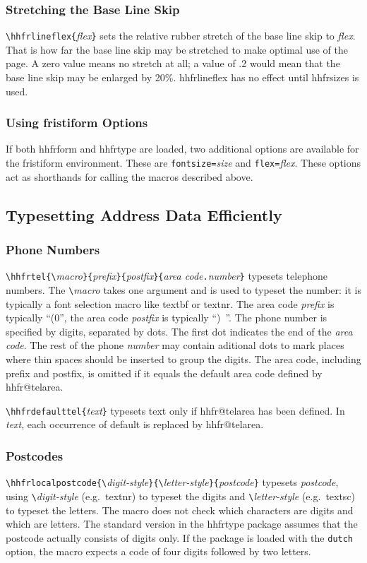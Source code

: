\documentclass[11pt]{article}
\makeatletter
\def\packagename#1{{\sffamily #1}}     %
\def\macroname#1{{\ttfamily\@ttbs#1}}  %
\def\envirname#1{{\ttfamily #1}}       %
\def\hhfrtype{\packagename{hhfrtype}\xspace}
\def\hhfrform{\packagename{hhfrform}\xspace}
\def\={\verb=}
\def\<#1>{\macroname{#1}}
\makeatother
\begin{document}
\subsubsection{Stretching the Base Line Skip}
\=\hhfrlineflex{=\textit{flex}\=}= sets the relative rubber
stretch of the base line skip to \textit{flex}. That is how far the
base line skip may be stretched to make optimal use of the page. A zero
value means no stretch at all; a value of .2 would mean that
the base line skip may be enlarged by 20\%. \<hhfrlineflex>
has no effect until \<hhfrsizes> is used.

\subsubsection{Using \envirname{fristiform} Options}
If both \hhfrform and \hhfrtype are loaded, two additional options
are available for the \envirname{fristiform} environment. These
are \texttt{fontsize=}\textit{size} and \texttt{flex=}\textit{flex}.
These options act as shorthands for calling the macros described
above.

\subsection{Typesetting Address Data Efficiently}

\subsubsection{Phone Numbers}
\=\hhfrtel{\=\textit{macro}\=}{=\textit{prefix}\=}{=\textit{postfix}\=}{=\textit{area code}\=.=\textit{number}\=}=
typesets telephone numbers.
The \=\=\textit{macro} takes one argument and is used to typeset the number:
it is typically a font selection macro like \<textbf> or \<textnr>.
The area code \textit{prefix} is typically ``(0'', the area code \textit{postfix}
is typically ``)~''. The phone number is specified by digits,
separated by dots. The first dot indicates the end of the
\textit{area code}. The rest of the phone \textit{number} may contain
aditional dots to mark places where thin spaces should be inserted to
group the digits. The area code, including prefix and postfix, is
omitted if it equals the default area code defined by \<hhfr@telarea>.

\=\hhfrdefaulttel{=\textit{text}\=}= typesets text only if \<hhfr@telarea>
has been defined. In \textit{text}, each occurrence of \<default>
is replaced by \<hhfr@telarea>.

\subsubsection{Postcodes}
\=\hhfrlocalpostcode{\=\textit{digit-style}\=}{\=\textit{letter-style}\=}{=\textit{postcode}\=}=
typesets \textit{postcode}, using \=\=\textit{digit-style} (e.g.\ \<textnr>)
to typeset the digits and \=\=\textit{letter-style} (e.g.\ \<textsc>) to
typeset the letters. The macro does not check which characters are digits
and which are letters. The standard version in the \hhfrtype package
assumes that the postcode actually consists of digits only. If the
package is loaded with the \texttt{dutch} option, the macro expects
a code of four digits followed by two letters.
\end{document}
